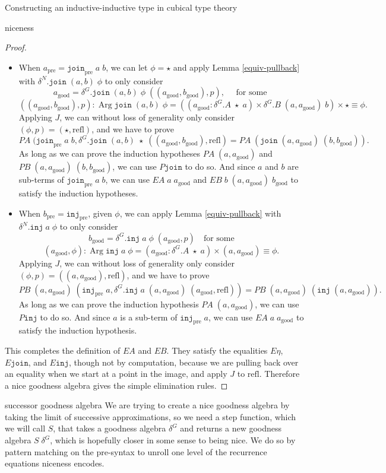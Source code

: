 \documentclass[acmsmall,review]{acmart}\settopmatter{printfolios=true,printccs=false,printacmref=false}
\DeclareMathOperator{\Arg}{Arg}
\newcommand{\pre}[1]{{#1}_\text{pre}}
\newcommand{\good}[1]{{#1}_\text{good}}
\newcommand{\Id}[2]{{#1}\equiv{#2}}
\newcommand{\join}{\texttt{join}}
\newcommand{\inj}{\texttt{inj}}
\begin{document}
\begin{section}{Constructing an inductive-inductive type in cubical type theory}
\begin{subsection}{niceness}
\begin{proof}
\begin{itemize}
\item When $\pre{a} = \pre{\join}\;a\;b$, we can let $\phi = \star$ and apply Lemma \ref{equiv-pullback} with $\delta^N.\join\;(a, b)\;\phi$ to only consider \[\good{a} = \delta^G.\join\;(a,b)\;\phi\;((\good{a}, \good{b}), p),\quad\text{ for some }\]\[((\good{a}, \good{b}), p) : \Arg\join\;(a, b)\;\phi = ((\good{a} : \delta^G.A\;\star\;a) \times \delta^G.B\;(a, \good{a})\;b) \times \Id{\star}{\phi}.\] Applying $J$, we can without loss of generality only consider $(\phi, p) = (\star, \text{refl})$, and we have to prove \[PA\;(\pre{\join}\;a\;b, \delta^G.\join\;(a, b)\;\star\;((\good{a}, \good{b}),\text{refl}) = PA\;(\join\;(a, \good{a})\;(b, \good{b})).\] As long as we can prove the induction hypotheses $PA\;(a, \good{a})$ and $PB\;(a, \good{a})\;(b, \good{b})$, we can use $P\join$ to do so. And since $a$ and $b$ are sub-terms of $\pre{\join}\;a\;b$, we can use $EA\;a\;\good{a}$ and $EB\;b\;(a, \good{a})\;\good{b}$ to satisfy the induction hypotheses.
\item When $\pre{b} = \pre{\inj}$, given $\phi$, we can apply Lemma \ref{equiv-pullback} with $\delta^N.\inj\;a\;\phi$ to only consider \[\good{b} = \delta^G.\inj\;a\;\phi\;(\good{a}, p)\quad\text{for some}\]\[(\good{a}, \phi) : \Arg\inj\;a\;\phi = (\good{a} : \delta^G.A\;\star\;a) \times \Id{(a, \good{a})}{\phi}.\] Applying $J$, we can without loss of generality only consider $(\phi, p) = ((a, \good{a}), \text{refl})$, and we have to prove \[PB\;(a, \good{a})\;(\pre{\inj}\;a, \delta^G.\inj\;a\;(a, \good{a})\;(\good{a}, \text{refl})) = PB\;(a, \good{a})\;(\inj\;(a, \good{a})).\] As long as we can prove the induction hypothesis $PA\;(a, \good{a})$, we can use $P\inj$ to do so. And since $a$ is a sub-term of $\pre{\inj}\;a$, we can use $EA\;a\;\good{a}$ to satisfy the induction hypothesis.
\end{itemize}
This completes the definition of $EA$ and $EB$. They satisfy the equalities $E\eta$, $E\join$, and $E\inj$, though not by computation, because we are pulling back over an equality when we start at a point in the image, and apply $J$ to $\text{refl}$. Therefore a nice goodness algebra gives the simple elimination rules.

\end{proof}

\end{subsection}

\begin{subsection}{successor goodness algebra}\label{ex-successor-alg}
We are trying to create a nice goodness algebra by taking the limit of successive approximations, so we need a step function, which we will call $S$, that takes a goodness algebra $\delta^G$ and returns a new goodness algebra $S\;\delta^G$, which is hopefully closer in some sense to being nice. We do so by pattern matching on the pre-syntax to unroll one level of the recurrence equations niceness encodes.


\end{subsection}
\end{section}
\end{document}
